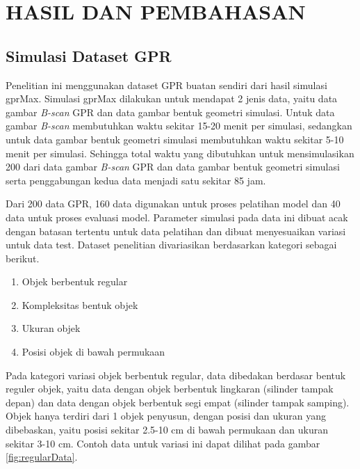 \chapter{HASIL DAN PEMBAHASAN}
\label{chap:hasilpembahasan}

\section{Simulasi Dataset GPR}
\label{sec:simulasiDatasetGPR}

Penelitian ini menggunakan dataset GPR buatan sendiri dari hasil simulasi gprMax. 
Simulasi gprMax dilakukan untuk mendapat 2 jenis data, yaitu data gambar \emph{B-scan} GPR dan data gambar bentuk geometri simulasi. 
Untuk data gambar \emph{B-scan} membutuhkan waktu sekitar 15-20 menit per simulasi, sedangkan untuk data gambar bentuk geometri simulasi membutuhkan waktu sekitar 5-10 menit per simulasi. 
Sehingga total waktu yang dibutuhkan untuk mensimulasikan 200 dari data gambar \emph{B-scan} GPR dan data gambar bentuk geometri simulasi serta penggabungan kedua data menjadi satu sekitar 85 jam.

Dari 200 data GPR, 160 data digunakan untuk proses pelatihan model dan 40 data untuk proses evaluasi model. 
Parameter simulasi pada data ini dibuat acak dengan batasan tertentu untuk data pelatihan dan dibuat menyesuaikan variasi untuk data test. 
Dataset penelitian divariasikan berdasarkan kategori sebagai berikut.

\begin{enumerate}[nolistsep]

  \item Objek berbentuk regular

  \item Kompleksitas bentuk objek

  \item Ukuran objek
  
  \item Posisi objek di bawah permukaan

\end{enumerate}

Pada kategori variasi objek berbentuk regular, data dibedakan berdasar bentuk reguler objek, yaitu data dengan objek berbentuk lingkaran (silinder tampak depan) dan data dengan objek berbentuk segi empat (silinder tampak samping). 
Objek hanya terdiri dari 1 objek penyusun, dengan posisi dan ukuran yang dibebaskan, yaitu posisi sekitar 2.5-10 cm di bawah permukaan dan ukuran sekitar 3-10 cm. 
Contoh data untuk variasi ini dapat dilihat pada gambar \ref{fig:regularData}.

